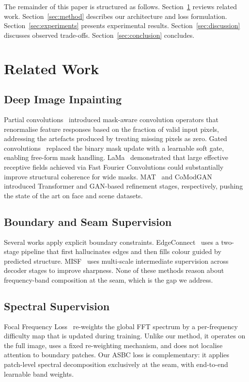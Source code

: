 \documentclass[10pt,conference]{IEEEtran}
\begin{document}
The remainder of this paper is structured as follows.
Section~\ref{sec:related} reviews related work.
Section~\ref{sec:method} describes our architecture and loss formulation.
Section~\ref{sec:experiments} presents experimental results.
Section~\ref{sec:discussion} discusses observed trade-offs.
Section~\ref{sec:conclusion} concludes.

\section{Related Work}
\label{sec:related}

\subsection{Deep Image Inpainting}
Partial convolutions~\cite{liu2018partial} introduced mask-aware convolution
operators that renormalise feature responses based on the fraction of valid
input pixels, addressing the artefacts produced by treating missing pixels as
zero.  Gated convolutions~\cite{yu2019free} replaced the binary mask update
with a learnable soft gate, enabling free-form mask handling.  LaMa~\cite{suvorov2022resolution}
demonstrated that large effective receptive fields achieved via Fast Fourier
Convolutions could substantially improve structural coherence for wide masks.
MAT~\cite{li2022mat} and CoModGAN~\cite{zhao2021large} introduced Transformer
and GAN-based refinement stages, respectively, pushing the state of the art on
face and scene datasets.

\subsection{Boundary and Seam Supervision}
Several works apply explicit boundary constraints.
EdgeConnect~\cite{nazeri2019edgeconnect} uses a two-stage pipeline that first
hallucinates edges and then fills colour guided by predicted structure.
MISF~\cite{li2022misf} uses multi-scale intermediate supervision across
decoder stages to improve sharpness.  None of these methods reason about
frequency-band composition at the seam, which is the gap we address.

\subsection{Spectral Supervision}
Focal Frequency Loss~\cite{jiang2021focal} re-weights the global FFT spectrum
by a per-frequency difficulty map that is updated during training.  Unlike
our method, it operates on the full image, uses a fixed re-weighting
mechanism, and does not localise attention to boundary patches.  Our ASBC
loss is complementary: it applies patch-level spectral decomposition
exclusively at the seam, with end-to-end learnable band weights.
\end{document}
